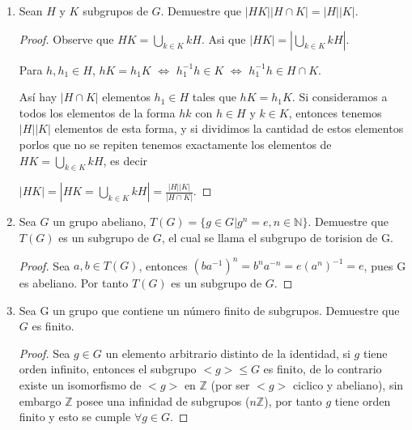 \documentclass{article}
\theoremstyle{break}
\begin{document}
\begin{enumerate}
\begin{proof}
\begin{itemize}
			\end{itemize}
		Por lo tanto el orden de $AB$ es infinito.
		
		Este ejemplo no contradice el ejercicio anterior, pues $AB\not=BA$, hipotesis necesaria para probar el enunciado.
		\end{proof}
		
		\item Sean $H$ y $K$ subgrupos de $G$. Demuestre que $|HK||H\cap K|=|H||K|$.
		
		\begin{proof}
			Observe que $HK=\bigcup _{k\in K}{kH}$. Asi que $|HK|=|\bigcup _{k\in K}{kH}|$. 
			
			Para $h,h_1 \in H$, $hK=h_1K$ $\Leftrightarrow$ $h_{1}^{-1}h\in K$ $\Leftrightarrow$ $h_{1}^{-1}h\in H\cap K$.
			
			As\'i hay $|H\cap K|$ elementos $h_1\in H$ tales que $hK=h_1 K$. Si consideramos a todos los elementos de la forma $hk$ con $h\in H$ y $k\in K$, entonces tenemos $|H||K|$ elementos de esta forma, y si dividimos la cantidad de estos elementos porlos que no se repiten tenemos exactamente los elementos de $HK=\bigcup _{k\in K}{kH}$, es decir 
			
			$|HK|=|HK=\bigcup _{k\in K}{kH}|=\frac{|H||K|}{|H\cap K|}$.
		\end{proof}
		
		\item Sea $G$ un grupo abeliano, $T(G)=\{g\in G|g^n=e, n\in\mathbb{N}\}$. Demuestre que $T(G)$ es un subgrupo de $G$, el cual se llama el subgrupo de torision de G.
		
			\begin{proof}
				Sea $a,b\in T(G)$, entonces $(ba^{-1})^n=b^n a^{-n}=e(a^n)^{-1}=e$, pues G es abeliano. Por tanto $T(G)$ es un subgrupo de $G$.
			\end{proof}
			
		\item Sea G un grupo que contiene un n\'umero finito de subgrupos. Demuestre que $G$ es finito.
		
		\begin{proof}
			Sea $g\in G$ un elemento arbitrario distinto de la identidad, si $g$ tiene orden infinito, entonces el subgrupo $<g> \leq G$ es finito, de lo contrario existe un isomorfismo de $<g>$ en $\mathbb{Z}$ (por ser $<g>$ ciclico y abeliano), sin embargo $\mathbb{Z}$ posee una infinidad de subgrupos ($n\mathbb{Z}$), por tanto $g$ tiene orden finito y esto se cumple $\forall g\in G$. 
			

\end{proof}
\end{enumerate}
\end{document}
